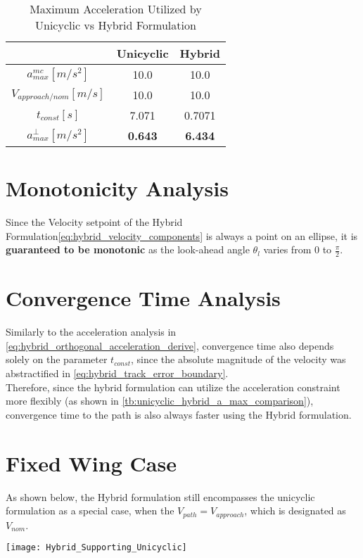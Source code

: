 \begin{table}[h]
\centering
\begin{tabular}{|c | c | c|}
 \hline
  & Unicyclic & Hybrid \\
 \hline
 $a_{max}^{mc} [m/s^2]$ & 10.0 & 10.0 \\ 
 \hline
$V_{approach / nom} [m/s]$ & 10.0 & 10.0 \\ 
 \hline
 $t_{const} [s]$ & 7.071 & 0.7071 \\ 
 \hline
 $a_{max}^{\perp} [m/s^2]$ & \textbf{0.643} & \textbf{6.434} \\
 \hline
\end{tabular}
\caption{Maximum Acceleration Utilized by Unicyclic vs Hybrid Formulation}
\label{tb:unicyclic_hybrid_a_max_comparison}
\end{table}

\section{Monotonicity Analysis}
Since the Velocity setpoint of the Hybrid Formulation\ref{eq:hybrid_velocity_components} is always a point on an ellipse, it is \textbf{guaranteed to be monotonic} as the look-ahead angle $\theta_l$ varies from 0 to $\frac{\pi}{2}$.

\section{Convergence Time Analysis}
Similarly to the acceleration analysis in \autoref{eq:hybrid_orthogonal_acceleration_derive}, convergence time also depends solely on the parameter $t_{const}$, since the absolute magnitude of the velocity was abstractified in \autoref{eq:hybrid_track_error_boundary}.\\

Therefore, since the hybrid formulation can utilize the acceleration constraint more flexibly (as shown in \autoref{tb:unicyclic_hybrid_a_max_comparison}), convergence time to the path is also always faster using the Hybrid formulation.

\section{Fixed Wing Case}

As shown below, the Hybrid formulation still encompasses the unicyclic formulation as a special case, when the $V_{path} = V_{approach}$, which is designated as $V_{nom}$.

\texttt{[image: Hybrid\_Supporting\_Unicyclic]}